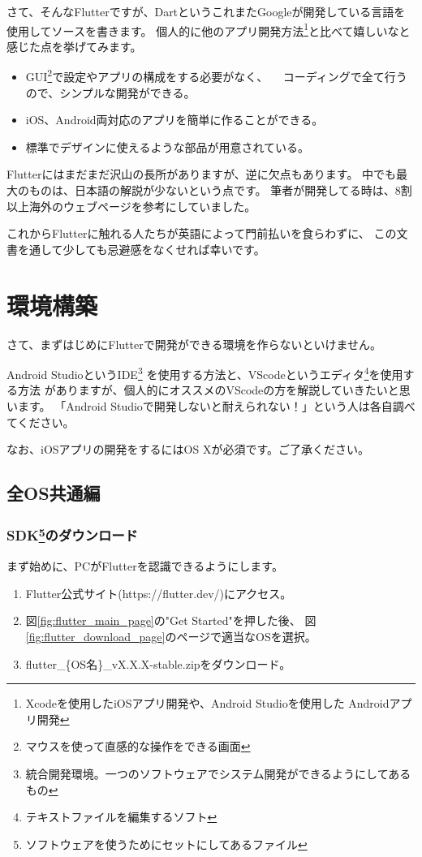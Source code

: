 \documentclass{jsarticle}
\begin{document}
        さて、そんなFlutterですが、DartというこれまたGoogleが開発している言語を使用してソースを書きます。
        個人的に他のアプリ開発方法\footnote{Xcodeを使用したiOSアプリ開発や、Android Studioを使用した
        Androidアプリ開発}と比べて嬉しいなと感じた点を挙げてみます。

        \begin{itemize}
            \item GUI\footnote{マウスを使って直感的な操作をできる画面}で設定やアプリの構成をする必要がなく、
                　コーディングで全て行うので、シンプルな開発ができる。
            \item iOS、Android両対応のアプリを簡単に作ることができる。
            \item 標準でデザインに使えるような部品が用意されている。
        \end{itemize}

        Flutterにはまだまだ沢山の長所がありますが、逆に欠点もあります。
        中でも最大のものは、日本語の解説が少ないという点です。
        筆者が開発してる時は、8割以上海外のウェブページを参考にしていました。
        
        これからFlutterに触れる人たちが英語によって門前払いを食らわずに、
        この文書を通して少しても忌避感をなくせれば幸いです。

    \section*{環境構築}
        さて、まずはじめにFlutterで開発ができる環境を作らないといけません。

        Android StudioというIDE\footnote{統合開発環境。一つのソフトウェアでシステム開発ができるようにしてあるもの}
        を使用する方法と、VScodeというエディタ\footnote{テキストファイルを編集するソフト}を使用する方法
        がありますが、個人的にオススメのVScodeの方を解説していきたいと思います。
        「Android Studioで開発しないと耐えられない！」という人は各自調べてください。

        なお、iOSアプリの開発をするにはOS Xが必須です。ご了承ください。

        \subsection*{全OS共通編}
            \subsubsection*{SDK\footnote{ソフトウェアを使うためにセットにしてあるファイル}のダウンロード}
                まず始めに、PCがFlutterを認識できるようにします。
            \begin{enumerate}
                \item Flutter公式サイト(https://flutter.dev/)にアクセス。
                \item 図\ref{fig:flutter_main_page}の"Get Started"を押した後、
                      図\ref{fig:flutter_download_page}のページで適当なOSを選択。
                \item flutter\_\{OS名\}\_vX.X.X-stable.zipをダウンロード。
            \end{enumerate}
\end{document}
